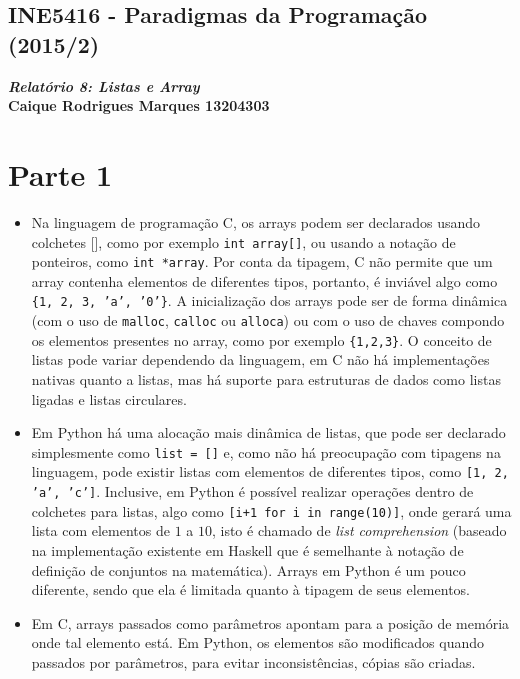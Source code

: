 \documentclass{article}
\begin{document}
    \begin{center}
        \section*{INE5416 - Paradigmas da Programação (2015/2)}
        \textbf{\textit{Relatório 8: Listas e Array} \\
        Caique Rodrigues Marques 13204303}
    \end{center}
    
    \section*{Parte 1}
        \begin{itemize}
            \item Na linguagem de programação C, os arrays podem ser declarados usando colchetes [], como por exemplo \texttt{int array[]}, ou usando a notação de ponteiros, como \texttt{int *array}. Por conta da tipagem, C não permite que um array contenha elementos de diferentes tipos, portanto, é inviável algo como \texttt{\{1, 2, 3, 'a', '0'\}}. A inicialização dos arrays pode ser de forma dinâmica (com o uso de \texttt{malloc}, \texttt{calloc} ou \texttt{alloca}) ou com o uso de chaves compondo os elementos presentes no array, como por exemplo \texttt{\{1,2,3\}}. O conceito de listas pode variar dependendo da linguagem, em C não há implementações nativas quanto a listas, mas há suporte para estruturas de dados como listas ligadas e listas circulares.
            
            \item Em Python há uma alocação mais dinâmica de listas, que pode ser declarado simplesmente como \texttt{list = []} e, como não há preocupação com tipagens na linguagem, pode existir listas com elementos de diferentes tipos, como \texttt{[1, 2, 'a', 'c']}. Inclusive, em Python é possível realizar operações dentro de colchetes para listas, algo como \texttt{[i+1 for i in range(10)]}, onde gerará uma lista com elementos de $1$ a $10$, isto é chamado de \textit{list comprehension} (baseado na implementação existente em Haskell que é semelhante à notação de definição de conjuntos na matemática). Arrays em Python é um pouco diferente, sendo que ela é limitada quanto à tipagem de seus elementos.
            
            \item Em C, arrays passados como parâmetros apontam para a posição de memória onde tal elemento está. Em Python, os elementos são modificados quando passados por parâmetros, para evitar inconsistências, cópias são criadas.
        \end{itemize}
        
\end{document}
